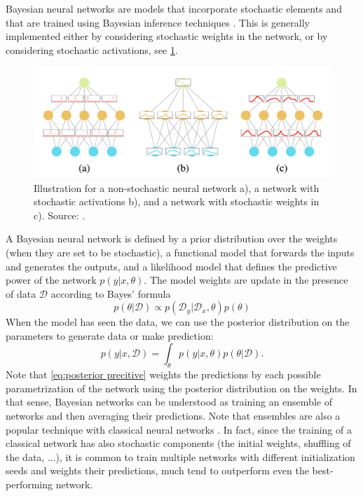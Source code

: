 Bayesian neural networks are models that incorporate stochastic elements and that are trained using Bayesian inference techniques \cite{BNN_review}. This is generally implemented either by considering stochastic weights in the network, or by considering 
stochastic activations, see \cref{fig:ML BNN ilus}.

\begin{figure}
    \centering
    \includegraphics[width=0.9\linewidth]{img/ML/scheme_bnn.png}
    \caption{Illustration for a non-stochastic neural network a), a network with stochastic activations b), and a network with stochastic weights in c). Source: \cite{BNN_review}.}
    \label{fig:ML BNN ilus}
\end{figure}
A Bayesian neural network is defined by a prior distribution over the weights (when they are set to be stochastic), a functional model that forwards the inputs and generates the outputs, and a likelihood model that defines the predictive power of the network $p(y|x,\theta)$. The model weights are update in the presence of data $\mathcal{D}$ according to Bayes' formula
\begin{equation}
    p(\theta|\mathcal{D}) \propto p(\mathcal{D}_y|\mathcal{D}_x, \theta)p(\theta)
\end{equation}
When the model has seen the data, we can use the posterior distribution on the parameters to generate data or make prediction:
\begin{equation}\label{eq:posterior precitive}
    p(y|x,\mathcal{D})=\int_\theta p(y|x,\theta)p(\theta|\mathcal{D}).
\end{equation}
Note that \cref{eq:posterior precitive} weights the predictions by each possible parametrization of the network using the posterior distribution on the weights. In that sense, Bayesian networks can be understood as training an ensemble of networks and then averaging their predictions. Note that ensembles are also a popular technique with classical neural networks \cite{ensemble}. In fact, since the training of a classical network has also stochastic components (the initial weights, shuffling of the data, ...), it is common to train multiple networks with different initialization seeds and weights their predictions, much tend to outperform even the best-performing network.


